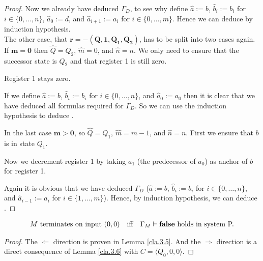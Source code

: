 \begin{proof}
	Now we already have deduced $\Gamma_D$, to see why define $\widehat{a}:=b$, $\widehat{b}_i:=b_i$ for $i\in\{0,\dots,n\}$, $\widehat{a}_0:=d$, and $\widehat{a}_{i+1}:=a_i$ for $i\in\{0,\dots,m\}$.
	Hence we can deduce \false{} by induction hypothesis.\\
	
	The other case, that $\boldsymbol{r=-(Q,1,Q_1,Q_2)}$, has to be split into two cases again. If $\boldsymbol{m=0}$ then $\widehat{Q}=Q_2$, $\widehat{m}=0$, and $\widehat{n}=n$. We only need to ensure that the successor state is $Q_2$ and that register 1 is still zero.
	
	\begin{figure}[H]
		\centering
		
	\end{figure}
	
	Register 1 stays zero.
	
	\begin{figure}[H]
		\centering
		
	\end{figure}
	
	If we define $\widehat{a}:=b$, $\widehat{b}_i:=b_i$ for $i\in\{0,\dots,n\}$, and $\widehat{a}_0:=a_0$ then it is clear that we have deduced all formulas required for $\Gamma_D$. So we can use the induction hypothesis to deduce \false{}.
	
	In the last case $\boldsymbol{m>0}$, so $\widehat{Q}=Q_1$, $\widehat{m}=m-1$, and $\widehat{n}=n$. First we ensure that $b$ is in state $Q_1$.
	
	\begin{figure}[H]
		\centering
		
	\end{figure}
	
	Now we decrement register 1 by taking $a_1$ (the predecessor of $a_0$) as anchor of $b$ for register 1.
	
	\begin{figure}[H]
		\centering
		
	\end{figure}
	
	Again it is obvious that we have deduced $\Gamma_D$ ($\widehat{a}:=b$, $\widehat{b}_i:=b_i$ for $i\in\{0,\dots,n\}$, and $\widehat{a}_{i-1}:=a_i$ for $i\in\{1,\dots,m\}$). Hence, by induction hypothesis, we can deduce \false{}.
\end{proof}

\begin{lemma}\label{lem.3.7}
	\begin{align*} %
		  & \text{$M$ terminates on input $(0,0)$} &   & \text{iff} & \text{$\Gamma_M\PModels\false$ holds in system P.} 
	\end{align*}
\end{lemma}
\begin{proof}
	The $\Leftarrow$ direction is proven in Lemma \ref{cla.3.5}. And the $\Rightarrow$ direction is a direct consequence of Lemma \ref{cla.3.6} with $C=\langle Q_0,0,0\rangle$.
\end{proof}

